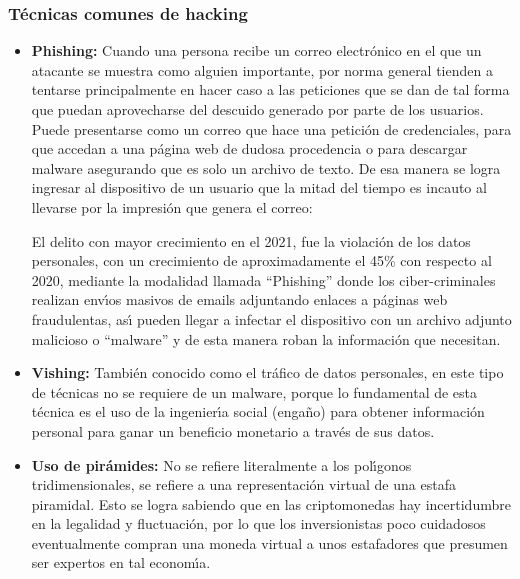 \subsubsection{T\'ecnicas comunes de hacking}

\begin{itemize}
	\item \textbf{Phishing:}
	      Cuando una persona recibe un correo electr\'onico en el que un atacante se
	      muestra como alguien importante, por norma general tienden a tentarse
	      principalmente en hacer caso a las peticiones que se dan de tal forma que
	      puedan aprovecharse del descuido generado por parte de los usuarios. Puede
	      presentarse como un correo que hace una petici\'on de credenciales, para que
	      accedan a una p\'agina web de dudosa procedencia o para descargar malware
	      asegurando que es solo un archivo de texto. De esa manera se logra ingresar al
	      dispositivo de un usuario que la mitad del tiempo es incauto al llevarse por la
	      impresi\'on que genera el correo:

	      \begin{displayquote}
		      El delito con mayor crecimiento en el 2021, fue la violaci\'on de los datos
		      personales, con un crecimiento de aproximadamente el 45\% con respecto al 2020,
		      mediante la modalidad llamada ``Phishing'' donde los ciber-criminales realizan
		      env\'{\i}os masivos de emails adjuntando enlaces a p\'aginas web fraudulentas, as\'{\i}
		      pueden llegar a infectar el dispositivo con un archivo adjunto malicioso o
		      ``malware'' y de esta manera roban la informaci\'on que necesitan.
		      \parencite[INCIBE, 2010, como se cita en][]{Bueno2022}
	      \end{displayquote}

	\item \textbf{Vishing:}
	      Tambi\'en conocido como el tr\'afico de datos personales, en este tipo de
	      t\'ecnicas no se requiere de un malware, porque lo fundamental de esta
	      t\'ecnica es el uso de la ingenier\'{\i}a social (enga\~no) para obtener informaci\'on
	      personal para ganar un beneficio monetario a trav\'es de sus datos.
	      \parencite{Mosquera2019}

	\item \textbf{Uso de pir\'amides:}
	      No se refiere literalmente a los pol\'{\i}gonos tridimensionales, se refiere a
	      una representaci\'on virtual de una estafa piramidal. Esto se logra sabiendo
	      que en las criptomonedas hay incertidumbre en la legalidad y fluctuaci\'on,
	      por lo que los inversionistas poco cuidadosos eventualmente compran una
	      moneda virtual a unos estafadores que presumen ser expertos en tal econom\'{\i}a.
	      \parencite{Mosquera2019}


\end{itemize}
